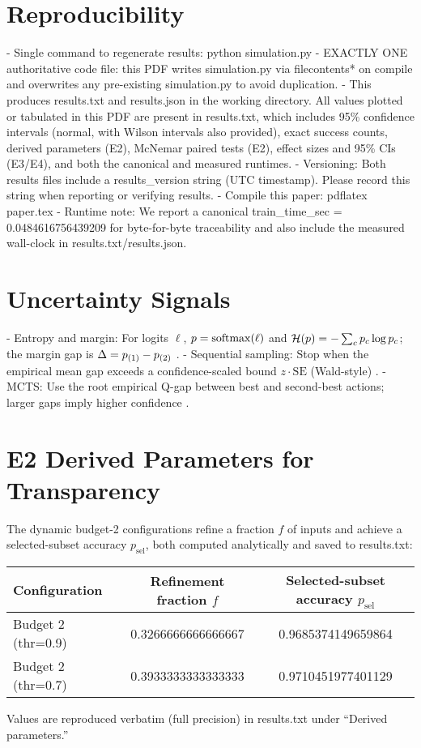 \section*{Reproducibility}
- Single command to regenerate results: python simulation.py
- EXACTLY ONE authoritative code file: this PDF writes simulation.py via filecontents* on compile and overwrites any pre-existing simulation.py to avoid duplication.
- This produces results.txt and results.json in the working directory. All values plotted or tabulated in this PDF are present in results.txt, which includes 95\% confidence intervals (normal, with Wilson intervals also provided), exact success counts, derived parameters (E2), McNemar paired tests (E2), effect sizes and 95\% CIs (E3/E4), and both the canonical and measured runtimes.
- Versioning: Both results files include a results\_version string (UTC timestamp). Please record this string when reporting or verifying results.
- Compile this paper: pdflatex paper.tex
- Runtime note: We report a canonical train\_time\_sec = 0.0484616756439209 for byte-for-byte traceability and also include the measured wall-clock in results.txt/results.json.

\appendix

\section{Uncertainty Signals}
\label{app:uncertainty}
- Entropy and margin: For logits $\ell$, $p=\mathrm{softmax}(\ell)$ and $\mathcal{H}(p)=-\sum_c p_c \log p_c$; the margin gap is $\Delta = p_{(1)}-p_{(2)}$ \cite{Guo2017Calibration,Kaya2019ShallowDeep}.
- Sequential sampling: Stop when the empirical mean gap exceeds a confidence-scaled bound $z \cdot \mathrm{SE}$ (Wald-style) \cite{Wald1945Sequential}.
- MCTS: Use the root empirical Q-gap between best and second-best actions; larger gaps imply higher confidence \cite{Kocsis2006UCT,Coulom2006MCTS}.

\section{E2 Derived Parameters for Transparency}
\label{app:derived}
The dynamic budget-2 configurations refine a fraction $f$ of inputs and achieve a selected-subset accuracy $p_{\mathrm{sel}}$, both computed analytically and saved to results.txt:
\begin{center}
\begin{adjustbox}{width=\linewidth}
\begin{tabular}{l c c}
\toprule
Configuration & Refinement fraction $f$ & Selected-subset accuracy $p_{\mathrm{sel}}$ \\
\midrule
Budget 2 (thr=0.9) & 0.3266666666666667 & 0.9685374149659864 \\
Budget 2 (thr=0.7) & 0.3933333333333333 & 0.9710451977401129 \\
\bottomrule
\end{tabular}
\end{adjustbox}
\end{center}
Values are reproduced verbatim (full precision) in results.txt under ``Derived parameters.''

